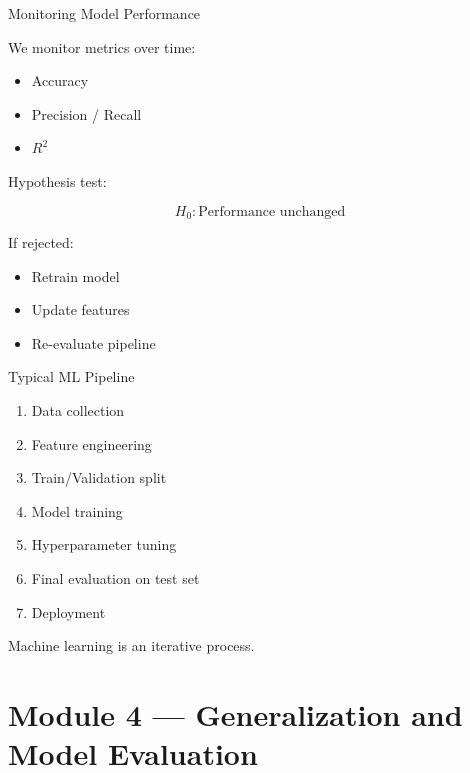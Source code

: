 \documentclass{beamer}
\begin{document}
\begin{frame}{Monitoring Model Performance}

We monitor metrics over time:

\begin{itemize}
    \item Accuracy
    \item Precision / Recall
    \item $R^2$
\end{itemize}

\vspace{0.5cm}

Hypothesis test:

\[
H_0: \text{Performance unchanged}
\]

\vspace{0.3cm}

If rejected:

\begin{itemize}
    \item Retrain model
    \item Update features
    \item Re-evaluate pipeline
\end{itemize}

\end{frame}

\begin{frame}{Typical ML Pipeline}

\begin{enumerate}
    \item Data collection
    \item Feature engineering
    \item Train/Validation split
    \item Model training
    \item Hyperparameter tuning
    \item Final evaluation on test set
    \item Deployment
\end{enumerate}

\vspace{0.5cm}

Machine learning is an iterative process.

\end{frame}
\section{Module 4 — Generalization and Model Evaluation}
\end{document}
